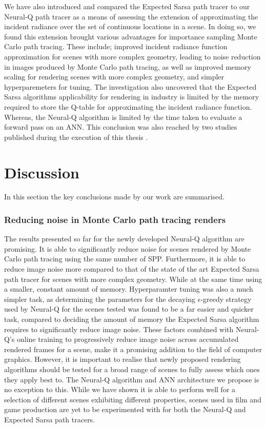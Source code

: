 \documentclass[../dissertation.tex]{subfiles}
\begin{document}
We have also introduced and compared the Expected Sarsa path tracer to our Neural-Q path tracer as a means of assessing the extension of approximating the incident radiance over the set of continuous locations in a scene. In doing so, we found this extension brought various advantages for importance sampling Monte Carlo path tracing. These include; improved incident radiance function approximation for scenes with more complex geometry, leading to noise reduction in images produced by Monte Carlo path tracing, as well as improved memory scaling for rendering scenes with more complex geometry, and simpler hyperparemeters for tuning. The investigation also uncovered that the Expected Sarsa algorithms applicability for rendering in industry is limited by the memory required to store the Q-table for approximating the incident radiance function. Whereas, the Neural-Q algorithm is limited by the time taken to evaluate a forward pass on an ANN. This conclusion was also reached by two studies published during the execution of this thesis \cite{keller2019integral, muller2018neural}.

\section{Discussion}

In this section the key conclusions made by our work are summarised. 

\subsubsection*{Reducing noise in Monte Carlo path tracing renders}
The results presented so far for the newly developed Neural-Q algorithm are promising. It is able to significantly reduce noise for scenes rendered by Monte Carlo path tracing using the same number of SPP. Furthermore, it is able to reduce image noise more compared to that of the state of the art Expected Sarsa path tracer for scenes with more complex geometry. While at the same time using a smaller, constant amount of memory. Hyperparamter tuning was also a much simpler task, as determining the parameters for the decaying $\epsilon$-greedy strategy used by Neural-Q for the scenes tested was found to be a far easier and quicker task, compared to deciding the amount of memory the Expected Sarsa algorithm requires to significantly reduce image noise. These factors combined with Neural-Q's online training to progressively reduce image noise across accumulated rendered frames for a scene, make it a promising addition to the field of computer graphics. However, it is important to realise that newly proposed rendering algorithms should be tested for a broad range of scenes to fully assess which ones they apply best to. The Neural-Q algorithm and ANN architecture we propose is no exception to this. While we have shown it is able to perform well for a selection of different scenes exhibiting different properties, scenes used in film and game production are yet to be experimented with for both the Neural-Q and Expected Sarsa path tracers.
\end{document}
